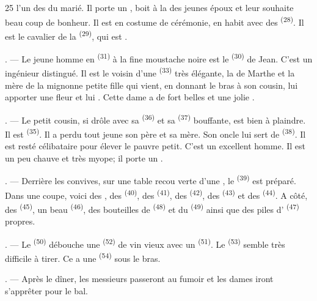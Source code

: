 \begin{VUpage}[27]{25}
\VUcontinue
l'un des  du marié. Il porte un , boit\nl
à la  des jeunes époux et leur souhaite beau\cc
coup de bonheur. Il est en costume de cérémonie, en\nl
habit avec des  \textsuperscript{(28)}. Il est le cavalier\nl
de la  \textsuperscript{(29)}, qui est .

. --- Le jeune homme en  \textsuperscript{(31)} à la fine\nl
moustache noire est le  \textsuperscript{(30)} de Jean.\nl
C'est un ingénieur distingué. Il est le voisin d'une\nl
{} \textsuperscript{(33)} très élégante, la  de\nl
Marthe et la mère de la mignonne petite fille qui\nl
vient, en donnant le bras à son cousin, lui apporter\nl
une fleur et lui . Cette dame\nl
a de fort belles  et une jolie\nl
{}.

. --- Le petit cousin, si drôle avec sa  \textsuperscript{(36)}\nl
et sa  \textsuperscript{(37)} bouffante, est bien à plaindre. Il est\nl
{} \textsuperscript{(35)}. Il a perdu tout jeune son père et sa\nl
mère. Son oncle lui sert de  \textsuperscript{(38)}. Il est resté\nl
célibataire pour élever le pauvre petit. C'est un\nl
excellent homme. Il est un peu chauve et très myope;\nl
il porte un .

. --- Derrière les convives, sur une table recou\cc
verte d'une , le  \textsuperscript{(39)} est préparé. Dans\nl
une coupe, voici des , des  \textsuperscript{(40)}, des\nl
{} \textsuperscript{(41)}, des  \textsuperscript{(42)}, des  \textsuperscript{(43)} et\nl
des  \textsuperscript{(44)}. A côté, des  \textsuperscript{(45)}, un beau\nl
{} \textsuperscript{(46)}, des bouteilles de  \textsuperscript{(48)} et du\nl
{} \textsuperscript{(49)} ainsi que des piles d' \textsuperscript{(47)}\nl
propres.

. --- Le  \textsuperscript{(50)} débouche une \cc
{} \textsuperscript{(52)} de vin vieux avec un  \textsuperscript{(51)}.\nl
Le  \textsuperscript{(53)} semble très difficile à tirer. Ce \cc
{} a une  \textsuperscript{(54)} sous le bras.

. --- Après le dîner, les messieurs passeront au\nl
fumoir et les dames iront s'apprêter pour le bal.
\end{VUpage}

